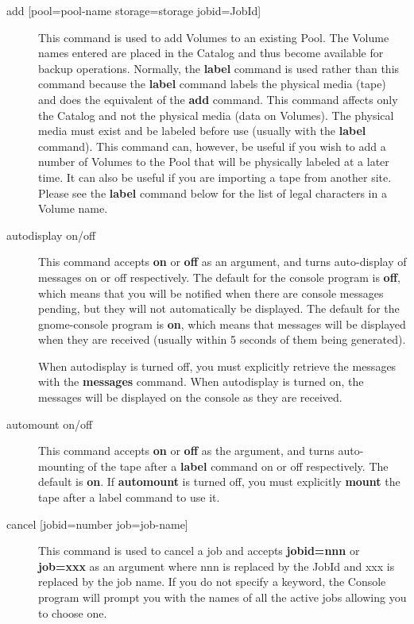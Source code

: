 \begin{description}
\item [{add [pool=\lt{}pool-name\gt{} storage=\lt{}storage\gt{}
   jobid=\lt{}JobId\gt{}]} ]
   \index[console]{add [pool }
This command is used to add Volumes to an existing Pool. The  Volume names
entered are placed in the Catalog and thus become  available for backup
operations. Normally, the {\bf label}  command is used rather than this
command because the {\bf label}  command labels the physical media (tape) and
does the equivalent of  the {\bf add} command. This command affects only the
Catalog and  not the physical media (data on Volumes). The physical media must
exist and be labeled before use (usually with the {\bf label}  command). This
command can, however, be useful if you wish to add  a number of Volumes to the
Pool that will be physically labeled at  a later time. It can also be useful
if you are importing a tape  from another site. Please see the {\bf label}
command below for  the list of legal characters in a Volume name.  

\item [autodisplay on/off]
   This command accepts {\bf on} or  {\bf off} as an argument, and turns
auto-display of messages on or  off respectively. The default for the console
program is  {\bf off}, which means that you will be notified when there are 
console messages pending, but they will not automatically be  displayed. The
default for the gnome-console program is  {\bf on}, which means that messages
will be displayed when  they are received (usually within 5 seconds of them
being  generated).  

When autodisplay is turned off, you must explicitly  retrieve the messages
with the {\bf messages} command. When  autodisplay is turned on, the messages
will be displayed on the  console as they are received.  

\item [automount on/off]
   This command accepts {\bf on} or {\bf off} as  the argument, and turns
auto-mounting of the tape after a  {\bf label} command on or off respectively.
The default is  {\bf on}. If {\bf automount} is turned off, you must
explicitly  {\bf mount} the tape after a label command to use it.  

\item [{cancel [jobid=\lt{}number\gt{} job=\lt{}job-name\gt{}]}]
   \index[console]{cancel [jobid }
   This  command is used to cancel a job and accepts {\bf jobid=nnn} or  {\bf
job=xxx} as an argument where nnn is replaced by the JobId  and xxx is
replaced by the job name. If you do not specify a  keyword, the Console
program will prompt you with the names of all  the active jobs allowing you to
choose one.  


\end{description}

